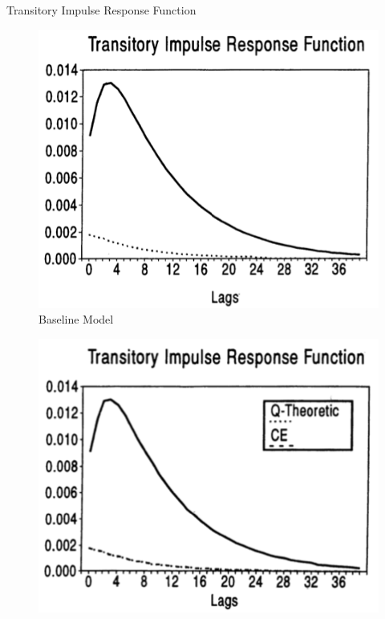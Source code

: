 \documentclass[10pt]{beamer}
\begin{document}
\begin{frame}{Transitory Impulse Response Function}
    \begin{minipage}{0.33\textwidth}
        \begin{figure}
            \centering
            \includegraphics[width=\linewidth]{figures/Base_trans_IRF.png}
            \caption{Baseline Model}
        \end{figure}
    \end{minipage}%
    \begin{minipage}{0.33\textwidth}
        \begin{figure}
            \centering
            \includegraphics[width=\linewidth]{figures/K_trans_IRF.png}

\end{figure}
\end{minipage}
\end{frame}
\end{document}
